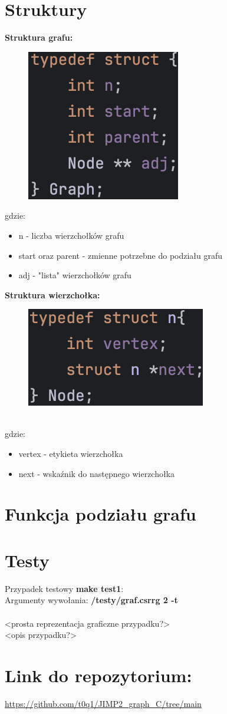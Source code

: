 \documentclass{article}
\begin{document}
\section*{Struktury}
\textbf{Struktura grafu:}\\

\begin{figure}[ht]
  \includegraphics[]{img/graph.png}
\end{figure}
gdzie:
\begin{itemize}
    \item n - liczba wierzchołków grafu
    \item start oraz parent - zmienne potrzebne do podziału grafu
    \item adj - "lista" wierzchołków grafu
\end{itemize}

\newpage
\textbf{Struktura wierzchołka:}\\
\begin{figure}[ht]
  \includegraphics[]{img/node.png}
\end{figure}\\
gdzie:
\begin{itemize}
    \item vertex - etykieta wierzchołka
    \item next - wskaźnik do następnego wierzchołka
\end{itemize}


\section*{Funkcja podziału grafu}

\section*{Testy}
Przypadek testowy \textbf{make test1}:\\
Argumenty wywołania: \textbf{/testy/graf.csrrg 2 -t}\\\\
<prosta reprezentacja graficzne przypadku?>\\
<opis przypadku?>

\section*{Link do repozytorium:}
\url{https://github.com/t0q1/JIMP2_graph_C/tree/main}
\end{document}
